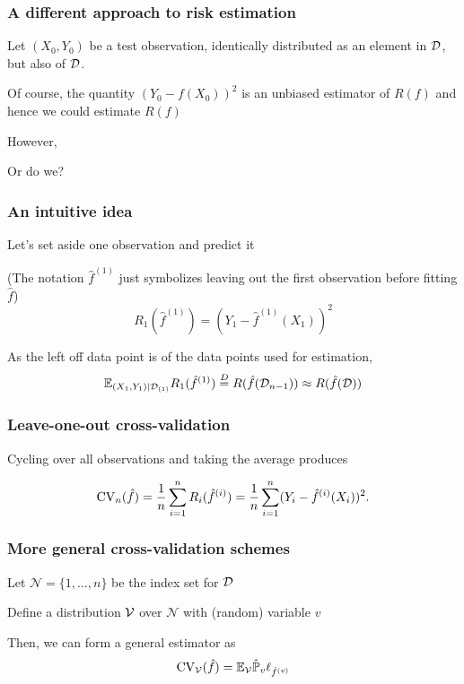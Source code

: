 \documentclass{beamer}
\begin{document}
\begin{frame}
\frametitle{A different approach to risk estimation}
 Let $(X_0,Y_0)$ be a test
observation, identically distributed as an element in $\mathcal{D}$, but also  of $\mathcal{D}$.
\vvsp

\vsp

Of course, the quantity $(Y_0 - f(X_0))^2$ is an unbiased estimator of $R(f)$ and hence we could
estimate $R(f)$
\vsp

However, 

\vsp
Or do we?

\end{frame}

\begin{frame}
\frametitle{An intuitive idea}
Let's set aside one observation and predict it

\vsp
{}

{\scriptsize (The notation $\hat{f}^{(1)}$
just symbolizes leaving out the first observation before fitting $\hat{f}$)}
\[
R_1(\hat{f}^{(1)}) = (Y_1 - \hat{f}^{(1)}(X_1))^2
\]

As the left off data point is  of the data points used for estimation, 
\[
\mathbb{E}_{(X_1,Y_1)|\mathcal{D}_{(1)}}R_1(\hat{f}^{(1)})  \stackrel{D}{=} R(\hat f(\mathcal{D}_{n-1}) ) \approx R(\hat f(\mathcal{D}))
\]


\end{frame}

\begin{frame}
\frametitle{Leave-one-out cross-validation}
Cycling over all observations and taking the average produces 

\[
\textrm{CV}_{n}(\hat{f}) =  \frac{1}{n} \sum_{i=1}^n R_i(\hat{f}^{(i)}) = \frac{1}{n} \sum_{i=1}^n (Y_i -  \hat{f}^{(i)}(X_i))^2.
\]

\end{frame}

\begin{frame}
\frametitle{More general cross-validation schemes}
Let $\mathcal{N} = \{1,\ldots,n\}$ be the index set for $\mathcal{D}$
\vsp

Define a distribution $\mathcal{V}$ over $\mathcal{N}$ with (random) variable $v$
\vsp
 
Then, we can form a general  estimator as
\[
\textrm{CV}_{\mathcal{V}}(\hat f) =  \mathbb{E}_{\mathcal{V}} \hat {\mathbb{P}}_v \ell_{\hat{f}^{(v)}}
\]
\end{frame}
\end{document}
